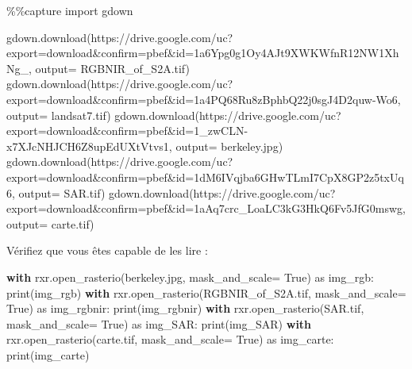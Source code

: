 \documentclass[
  french,
  11pt,
  letterpaper,
  open=any,
  twoside=false,
  french]{scrbook}
\newenvironment{Shaded}{\begin{snugshade}}{\end{snugshade}}
\newcommand{\BuiltInTok}[1]{\textcolor[rgb]{0.00,0.23,0.31}{#1}}
\newcommand{\ControlFlowTok}[1]{\textcolor[rgb]{0.00,0.23,0.31}{\textbf{#1}}}
\newcommand{\ImportTok}[1]{\textcolor[rgb]{0.00,0.46,0.62}{#1}}
\newcommand{\NormalTok}[1]{\textcolor[rgb]{0.00,0.23,0.31}{#1}}
\newcommand{\OperatorTok}[1]{\textcolor[rgb]{0.37,0.37,0.37}{#1}}
\newcommand{\StringTok}[1]{\textcolor[rgb]{0.13,0.47,0.30}{#1}}
\newcommand{\VariableTok}[1]{\textcolor[rgb]{0.07,0.07,0.07}{#1}}
\begin{document}
\begin{Shaded}
\begin{Highlighting}[]
\OperatorTok{\%\%}\NormalTok{capture}
\ImportTok{import}\NormalTok{ gdown}

\NormalTok{gdown.download(}\StringTok{\textquotesingle{}https://drive.google.com/uc?export=download\&confirm=pbef\&id=1a6Ypg0g1Oy4AJt9XWKWfnR12NW1XhNg\_\textquotesingle{}}\NormalTok{, output}\OperatorTok{=} \StringTok{\textquotesingle{}RGBNIR\_of\_S2A.tif\textquotesingle{}}\NormalTok{)}
\NormalTok{gdown.download(}\StringTok{\textquotesingle{}https://drive.google.com/uc?export=download\&confirm=pbef\&id=1a4PQ68Ru8zBphbQ22j0sgJ4D2quw{-}Wo6\textquotesingle{}}\NormalTok{, output}\OperatorTok{=} \StringTok{\textquotesingle{}landsat7.tif\textquotesingle{}}\NormalTok{)}
\NormalTok{gdown.download(}\StringTok{\textquotesingle{}https://drive.google.com/uc?export=download\&confirm=pbef\&id=1\_zwCLN{-}x7XJcNHJCH6Z8upEdUXtVtvs1\textquotesingle{}}\NormalTok{, output}\OperatorTok{=} \StringTok{\textquotesingle{}berkeley.jpg\textquotesingle{}}\NormalTok{)}
\NormalTok{gdown.download(}\StringTok{\textquotesingle{}https://drive.google.com/uc?export=download\&confirm=pbef\&id=1dM6IVqjba6GHwTLmI7CpX8GP2z5txUq6\textquotesingle{}}\NormalTok{, output}\OperatorTok{=} \StringTok{\textquotesingle{}SAR.tif\textquotesingle{}}\NormalTok{)}
\NormalTok{gdown.download(}\StringTok{\textquotesingle{}https://drive.google.com/uc?export=download\&confirm=pbef\&id=1aAq7crc\_LoaLC3kG3HkQ6Fv5JfG0mswg\textquotesingle{}}\NormalTok{, output}\OperatorTok{=} \StringTok{\textquotesingle{}carte.tif\textquotesingle{}}\NormalTok{)}
\end{Highlighting}
\end{Shaded}

Vérifiez que vous êtes capable de les lire :

\begin{Shaded}
\begin{Highlighting}[]
\ControlFlowTok{with}\NormalTok{ rxr.open\_rasterio(}\StringTok{\textquotesingle{}berkeley.jpg\textquotesingle{}}\NormalTok{, mask\_and\_scale}\OperatorTok{=} \VariableTok{True}\NormalTok{) }\ImportTok{as}\NormalTok{ img\_rgb:}
    \BuiltInTok{print}\NormalTok{(img\_rgb)}
\ControlFlowTok{with}\NormalTok{ rxr.open\_rasterio(}\StringTok{\textquotesingle{}RGBNIR\_of\_S2A.tif\textquotesingle{}}\NormalTok{, mask\_and\_scale}\OperatorTok{=} \VariableTok{True}\NormalTok{) }\ImportTok{as}\NormalTok{ img\_rgbnir:}
    \BuiltInTok{print}\NormalTok{(img\_rgbnir)}
\ControlFlowTok{with}\NormalTok{ rxr.open\_rasterio(}\StringTok{\textquotesingle{}SAR.tif\textquotesingle{}}\NormalTok{, mask\_and\_scale}\OperatorTok{=} \VariableTok{True}\NormalTok{) }\ImportTok{as}\NormalTok{ img\_SAR:}
    \BuiltInTok{print}\NormalTok{(img\_SAR)}
\ControlFlowTok{with}\NormalTok{ rxr.open\_rasterio(}\StringTok{\textquotesingle{}carte.tif\textquotesingle{}}\NormalTok{, mask\_and\_scale}\OperatorTok{=} \VariableTok{True}\NormalTok{) }\ImportTok{as}\NormalTok{ img\_carte:}
    \BuiltInTok{print}\NormalTok{(img\_carte)}
\end{Highlighting}
\end{Shaded}
\end{document}
